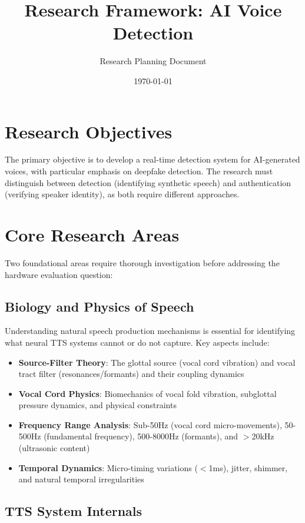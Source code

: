 \documentclass{article}
\title{\textbf{Research Framework: AI Voice Detection}}
\author{Research Planning Document}
\date{\today}
\begin{document}
\maketitle

\section{Research Objectives}

The primary objective is to develop a real-time detection system for AI-generated voices, with particular emphasis on deepfake detection. The research must distinguish between detection (identifying synthetic speech) and authentication (verifying speaker identity), as both require different approaches.

\section{Core Research Areas}

Two foundational areas require thorough investigation before addressing the hardware evaluation question:

\subsection{Biology and Physics of Speech}

Understanding natural speech production mechanisms is essential for identifying what neural TTS systems cannot or do not capture. Key aspects include:

\begin{itemize}
    \item \textbf{Source-Filter Theory}: The glottal source (vocal cord vibration) and vocal tract filter (resonances/formants) and their coupling dynamics
    \item \textbf{Vocal Cord Physics}: Biomechanics of vocal fold vibration, subglottal pressure dynamics, and physical constraints
    \item \textbf{Frequency Range Analysis}: Sub-50Hz (vocal cord micro-movements), 50-500Hz (fundamental frequency), 500-8000Hz (formants), and $>$20kHz (ultrasonic content)
    \item \textbf{Temporal Dynamics}: Micro-timing variations ($<$1ms), jitter, shimmer, and natural temporal irregularities
\end{itemize}

\subsection{TTS System Internals}
\end{document}
